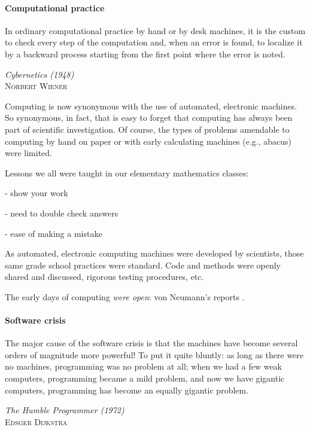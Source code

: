 \documentclass[ChapterTOCs,krantz2]{krantz} %
\begin{document}
\paragraph{ {\bf Computational practice}}

\setlength{\epigraphrule}{0pt}
\setlength{\epigraphwidth}{.65\textwidth}
\epigraph%
{%
  In ordinary computational practice by hand or by desk machines, it
  is the custom to check every step of the computation and, when an
  error is found, to localize it by a backward process starting from
  the first point where the error is noted.
}%
{\textit{Cybernetics (1948)}\\ \textsc{Norbert Wiener} }

Computing is now synonymous with the use of automated, electronic machines.  So
synonymous, in fact, that is easy to forget that computing has always been part
of scientific investigation. Of course, the types of problems amendable to
computing by hand on paper or with early calculating machines (e.g., abacus)
were limited. 

Lessons we all were taught in our elementary mathematics classes:

- show your work

- need to double check answers

- ease of making a mistake

As automated, electronic computing machines were developed by scientists,
those same grade school practices were standard.  Code and methods were
openly shared and discussed, rigorous testing procedures, etc.

The early days of computing \emph{were open}: von Neumann's reports
\cite{grcar2011john}.

\paragraph{ {\bf Software crisis}}

\setlength{\epigraphrule}{0pt}
\setlength{\epigraphwidth}{.65\textwidth}
\epigraph%
{%
  The major cause of the software crisis is that the machines have become
  several orders of magnitude more powerful! To put it quite bluntly: as long
  as there were no machines, programming was no problem at all; when we had a
  few weak computers, programming became a mild problem, and now we have
  gigantic computers, programming has become an equally gigantic problem.
}%
{\textit{The Humble Programmer (1972)}\\ \textsc{Edsger Dijkstra} }
\end{document}
